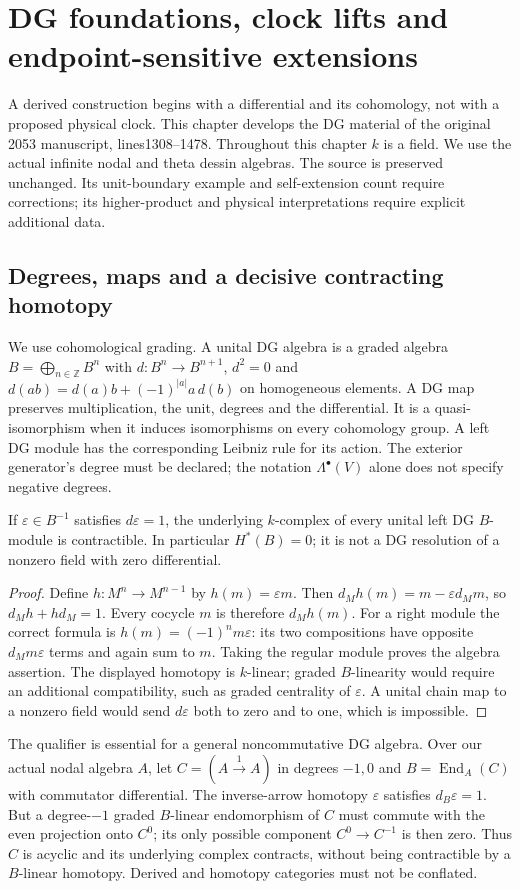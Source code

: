 \chapter[DG foundations and actual clock lifts]{DG foundations, clock lifts and endpoint-sensitive extensions}
\label{dg:chapter}
A derived construction begins with a differential and its cohomology, not
with a proposed physical clock. This chapter develops the DG material of the
original 2053 manuscript, lines1308--1478. Throughout this chapter $k$ is a
field. We use the actual infinite nodal
and theta dessin algebras. The source is preserved unchanged. Its unit-boundary
example and self-extension count require corrections; its higher-product
and physical interpretations require explicit additional data.

\section{Degrees, maps and a decisive contracting homotopy}
We use cohomological grading. A unital DG algebra is a graded algebra
$B=\bigoplus_{n\in\mathbb Z}B^n$ with $d:B^n\to B^{n+1}$,
$d^2=0$ and $d(ab)=d(a)b+(-1)^{|a|}a\,d(b)$ on homogeneous elements.
A DG map preserves multiplication, the unit, degrees and the differential.
It is a quasi-isomorphism when it induces isomorphisms on every cohomology
group. A left DG module has the corresponding Leibniz rule for its action.
The exterior generator's degree must be declared; the notation
$\Lambda^\bullet(V)$ alone does not specify negative degrees.

\begin{proposition}\label{dg:unit}
If $\varepsilon\in B^{-1}$ satisfies $d\varepsilon=1$, the underlying
$k$-complex of every unital left DG $B$-module is contractible. In particular $H^*(B)=0$; it is not a DG
resolution of a nonzero field with zero differential.
\end{proposition}
\begin{proof}
Define $h:M^n\to M^{n-1}$ by $h(m)=\varepsilon m$. Then
$d_Mh(m)=m-\varepsilon d_Mm$, so $d_Mh+hd_M=1$. Every cocycle $m$
is therefore $d_Mh(m)$. For a right module the correct formula is
$h(m)=(-1)^n m\varepsilon$: its two compositions have opposite
$d_Mm\varepsilon$ terms and again sum to $m$. Taking the regular module
proves the algebra assertion. The displayed homotopy is $k$-linear; graded
$B$-linearity would require an additional compatibility, such as graded
centrality of $\varepsilon$. A unital chain map to a nonzero field would
send $d\varepsilon$ both to zero and to one, which is impossible.
\end{proof}
The qualifier is essential for a general noncommutative DG algebra.
Over our actual nodal algebra $A$, let $C=(A\xrightarrow{1}A)$ in degrees
$-1,0$ and $B=\operatorname{End}_A(C)$ with commutator differential.
The inverse-arrow homotopy $\varepsilon$ satisfies $d_B\varepsilon=1$.
But a degree-$-1$ graded $B$-linear endomorphism of $C$ must commute with
the even projection onto $C^0$; its only possible component $C^0\to C^{-1}$
is then zero. Thus $C$ is acyclic and its underlying complex contracts,
without being contractible by a $B$-linear homotopy. Derived and homotopy
categories must not be conflated.

